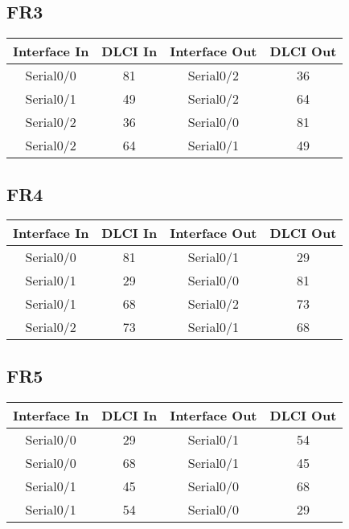 \documentclass[12pt, a4paper, spanish]{article}
\begin{document}
\subsection{FR3}
\begin{center}
\begin{tabular}{|c|c|c|c|}
\hline
Interface In & DLCI In & Interface Out & DLCI Out \\
\hline
\hline
Serial0/0 & 81 & Serial0/2 & 36 \\
\hline
Serial0/1 & 49 & Serial0/2 & 64 \\
\hline
Serial0/2 & 36 & Serial0/0 & 81 \\
\hline
Serial0/2 & 64 & Serial0/1 & 49 \\
\hline
\end{tabular}
\end{center}

\subsection{FR4}
\begin{center}
\begin{tabular}{|c|c|c|c|}
\hline
Interface In & DLCI In & Interface Out & DLCI Out \\
\hline
\hline
Serial0/0 & 81 & Serial0/1 & 29 \\
\hline
Serial0/1 & 29 & Serial0/0 & 81 \\
\hline
Serial0/1 & 68 & Serial0/2 & 73 \\
\hline
Serial0/2 & 73 & Serial0/1 & 68 \\
\hline
\end{tabular}
\end{center}

\subsection{FR5}
\begin{center}
\begin{tabular}{|c|c|c|c|}
\hline
Interface In & DLCI In & Interface Out & DLCI Out \\
\hline
\hline
Serial0/0 & 29 & Serial0/1 & 54 \\
\hline
Serial0/0 & 68 & Serial0/1 & 45 \\
\hline
Serial0/1 & 45 & Serial0/0 & 68 \\
\hline
Serial0/1 & 54 & Serial0/0 & 29 \\
\hline
\end{tabular}
\end{center}
\end{document}
